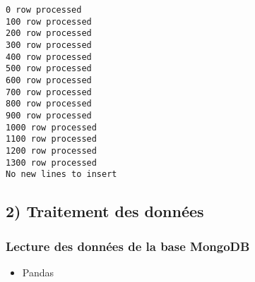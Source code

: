 \documentclass[11pt]{article}
\providecommand{\tightlist}{%
      \setlength{\itemsep}{0pt}\setlength{\parskip}{0pt}}
\begin{document}
    \begin{Verbatim}[commandchars=\\\{\}]
0 row processed
100 row processed
200 row processed
300 row processed
400 row processed
500 row processed
600 row processed
700 row processed
800 row processed
900 row processed
1000 row processed
1100 row processed
1200 row processed
1300 row processed
No new lines to insert

    \end{Verbatim}

    \hypertarget{traitement-des-donnuxe9es}{%
\subsection{2) Traitement des données}\label{traitement-des-donnuxe9es}}

    \hypertarget{lecture-des-donnuxe9es-de-la-base-mongodb}{%
\subsubsection{Lecture des données de la base
MongoDB}\label{lecture-des-donnuxe9es-de-la-base-mongodb}}

    \begin{itemize}
\tightlist
\item
  Pandas
\end{itemize}
\end{document}
